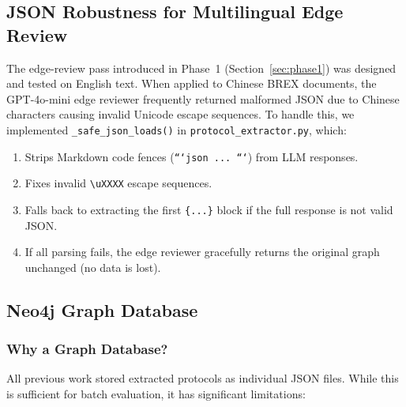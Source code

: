 \documentclass[12pt,a4paper]{article}
\begin{document}
\subsection{JSON Robustness for Multilingual Edge Review}
\label{sec:edge-review}

The edge-review pass introduced in Phase~1 (Section~\ref{sec:phase1}) was designed and tested on English text. When applied to Chinese BREX documents, the GPT-4o-mini edge reviewer frequently returned malformed JSON due to Chinese characters causing invalid Unicode escape sequences. To handle this, we implemented \texttt{\_safe\_json\_loads()} in \texttt{protocol\_extractor.py}, which:
\begin{enumerate}[leftmargin=2em]
    \item Strips Markdown code fences (\texttt{```json ... ```}) from LLM responses.
    \item Fixes invalid \texttt{\textbackslash uXXXX} escape sequences.
    \item Falls back to extracting the first \texttt{\{...\}} block if the full response is not valid JSON.
    \item If all parsing fails, the edge reviewer gracefully returns the original graph unchanged (no data is lost).
\end{enumerate}

\subsection{Neo4j Graph Database}
\label{sec:neo4j}

\subsubsection{Why a Graph Database?}

All previous work stored extracted protocols as individual JSON files. While this is sufficient for batch evaluation, it has significant limitations:
\end{document}
